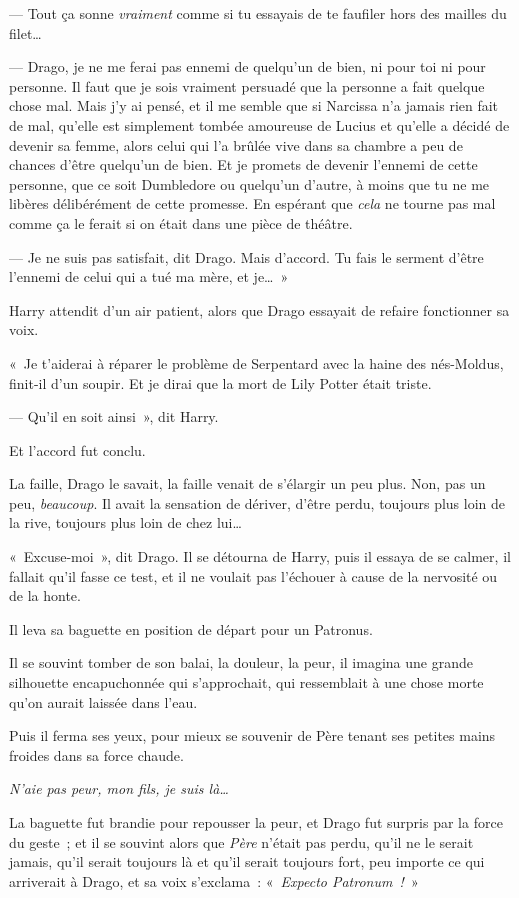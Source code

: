 --- Tout ça sonne \emph{vraiment} comme si tu essayais de te faufiler hors des mailles du filet…

--- Drago, je ne me ferai pas ennemi de quelqu'un de bien, ni pour toi ni pour personne. Il faut que je sois vraiment persuadé que la personne a fait quelque chose mal. Mais j'y ai pensé, et il me semble que si Narcissa n'a jamais rien fait de mal, qu'elle est simplement tombée amoureuse de Lucius et qu'elle a décidé de devenir sa femme, alors celui qui l'a brûlée vive dans sa chambre a peu de chances d'être quelqu'un de bien. Et je promets de devenir l'ennemi de cette personne, que ce soit Dumbledore ou quelqu'un d'autre, à moins que tu ne me libères délibérément de cette promesse. En espérant que \emph{cela} ne tourne pas mal comme ça le ferait si on était dans une pièce de théâtre.

--- Je ne suis pas satisfait, dit Drago. Mais d'accord. Tu fais le serment d'être l'ennemi de celui qui a tué ma mère, et je…~»

Harry attendit d'un air patient, alors que Drago essayait de refaire fonctionner sa voix.

«~Je t'aiderai à réparer le problème de Serpentard avec la haine des nés-Moldus, finit-il d'un soupir. Et je dirai que la mort de Lily Potter était triste.

--- Qu'il en soit ainsi~», dit Harry.

Et l'accord fut conclu.

La faille, Drago le savait, la faille venait de s'élargir un peu plus. Non, pas un peu, \emph{beaucoup}. Il avait la sensation de dériver, d'être perdu, toujours plus loin de la rive, toujours plus loin de chez lui…

«~Excuse-moi~», dit Drago. Il se détourna de Harry, puis il essaya de se calmer, il fallait qu'il fasse ce test, et il ne voulait pas l'échouer à cause de la nervosité ou de la honte.

Il leva sa baguette en position de départ pour un Patronus.

Il se souvint tomber de son balai, la douleur, la peur, il imagina une grande silhouette encapuchonnée qui s'approchait, qui ressemblait à une chose morte qu'on aurait laissée dans l'eau.

Puis il ferma ses yeux, pour mieux se souvenir de Père tenant ses petites mains froides dans sa force chaude.

\emph{N'aie pas peur, mon fils, je suis là…}

La baguette fut brandie pour repousser la peur, et Drago fut surpris par la force du geste~; et il se souvint alors que \emph{Père} n'était pas perdu, qu'il ne le serait jamais, qu'il serait toujours là et qu'il serait toujours fort, peu importe ce qui arriverait à Drago, et sa voix s'exclama~: «~\emph{Expecto Patronum~!}~»

